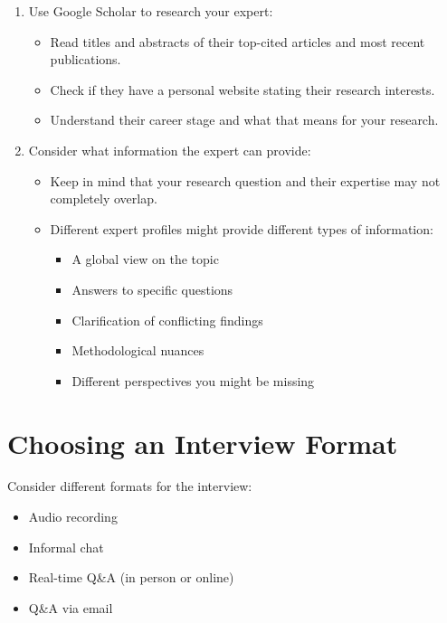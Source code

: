 \documentclass[
  letterpaper,
  DIV=11,
  numbers=noendperiod]{scrreprt}
\providecommand{\tightlist}{%
  \setlength{\itemsep}{0pt}\setlength{\parskip}{0pt}}\usepackage{longtable,booktabs,array}
\begin{document}
\begin{enumerate}
\def\labelenumi{\arabic{enumi}.}
\tightlist
\item
  Use Google Scholar to research your expert:

  \begin{itemize}
  \tightlist
  \item
    Read titles and abstracts of their top-cited articles and most
    recent publications.
  \item
    Check if they have a personal website stating their research
    interests.
  \item
    Understand their career stage and what that means for your research.
  \end{itemize}
\item
  Consider what information the expert can provide:

  \begin{itemize}
  \tightlist
  \item
    Keep in mind that your research question and their expertise may not
    completely overlap.
  \item
    Different expert profiles might provide different types of
    information:

    \begin{itemize}
    \tightlist
    \item
      A global view on the topic
    \item
      Answers to specific questions
    \item
      Clarification of conflicting findings
    \item
      Methodological nuances
    \item
      Different perspectives you might be missing
    \end{itemize}
  \end{itemize}
\end{enumerate}

\section{Choosing an Interview
Format}\label{choosing-an-interview-format}

Consider different formats for the interview:

\begin{itemize}
\tightlist
\item
  Audio recording
\item
  Informal chat
\item
  Real-time Q\&A (in person or online)
\item
  Q\&A via email
\end{itemize}
\end{document}
